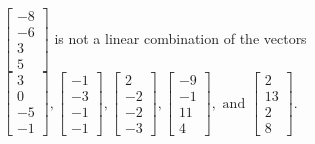 \begin{exercise}
\begin{exerciseStatement}
  \end{exerciseStatement}
  \begin{exerciseAnswer}
   \(\left[\begin{array}{c}
-8 \\
-6 \\
3 \\
5
\end{array}\right]\) 
  	 is not  
	a linear combination of the vectors \(\left[\begin{array}{c}
3 \\
0 \\
-5 \\
-1
\end{array}\right] , \left[\begin{array}{c}
-1 \\
-3 \\
-1 \\
-1
\end{array}\right] , \left[\begin{array}{c}
2 \\
-2 \\
-2 \\
-3
\end{array}\right] , \left[\begin{array}{c}
-9 \\
-1 \\
11 \\
4
\end{array}\right] , \text{ and } \left[\begin{array}{c}
2 \\
13 \\
2 \\
8
\end{array}\right]\).

	
  


  \end{exerciseAnswer}
\end{exercise}